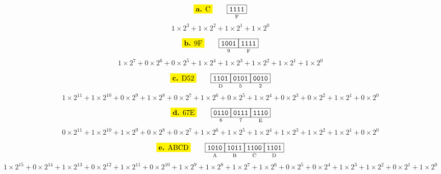 \documentclass[a4paper,12pt]{article}
\begin{document}
	\[
	\mathtt{
		\colorbox{yellow}{\textbf{a.} C} \qquad
		\underset{\text{F}}{\boxed{\mathtt{1111}}}
	}	
	\]
	\[
	1\times2^{3} + 1\times2^{2} + 1\times2^{1} + 1\times2^{0}
	\]
	\begin{center}
	\end{center}
	\[
	\mathtt{
		\colorbox{yellow}{\textbf{b.} 9F} \qquad
		\underset{\text{9}}{\boxed{\mathtt{1001}}}
		\underset{\text{F}}{\boxed{\mathtt{1111}}}
	}	
	\]
	\[
	1\times2^{7} + 0\times2^{6} + 0\times2^{5} + 1\times2^{4} + 1\times2^{3} + 1\times2^{2} + 1\times2^{1} + 1\times2^{0}
	\]
	\begin{center}
	\end{center}
	\[
	\mathtt{
		\colorbox{yellow}{\textbf{c.} D52} \qquad
		\underset{\text{D}}{\boxed{\mathtt{1101}}}
		\underset{\text{5}}{\boxed{\mathtt{0101}}}
		\underset{\text{2}}{\boxed{\mathtt{0010}}}
	}	
	\]
	\[
	1\times2^{11} + 1\times2^{10} + 0\times2^{9} + 1\times2^{8} + 0\times2^{7} + 1\times2^{6} + 0\times2^{5} + 1\times2^{4} + 0\times2^{3} + 0\times2^{2} + 1\times2^{1} + 0\times2^{0}
	\]
	\begin{center}
	\end{center}
	\[
	\mathtt{
		\colorbox{yellow}{\textbf{d.} 67E} \qquad
		\underset{\text{6}}{\boxed{\mathtt{0110}}}
		\underset{\text{7}}{\boxed{\mathtt{0111}}}
		\underset{\text{E}}{\boxed{\mathtt{1110}}}
	}	
	\]
	\[
	0\times2^{11} + 1\times2^{10} + 1\times2^{9} + 0\times2^{8} + 0\times2^{7} + 1\times2^{6} + 1\times2^{5} + 1\times2^{4} + 1\times2^{3} + 1\times2^{2} + 1\times2^{1} + 0\times2^{0}
	\]
	\begin{center}
	\end{center}
	\[
	\mathtt{
		\colorbox{yellow}{\textbf{e.} ABCD} \qquad
		\underset{\text{A}}{\boxed{\mathtt{1010}}}
		\underset{\text{B}}{\boxed{\mathtt{1011}}}
		\underset{\text{C}}{\boxed{\mathtt{1100}}}
		\underset{\text{D}}{\boxed{\mathtt{1101}}}
	}	
	\]
	\[
	1\times2^{15} + 0\times2^{14} + 1\times2^{13} + 0\times2^{12} + 1\times2^{11} + 0\times2^{10} + 1\times2^{9} + 1\times2^{8} + 1\times2^{7} + 1\times2^{6} + 0\times2^{5} + 0\times2^{4} + 1\times2^{3} + 1\times2^{2} + 0\times2^{1} + 1\times2^{0}
	\]
	\begin{center}
	\end{center}
	
\end{document}
